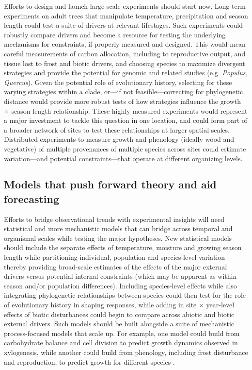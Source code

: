 Efforts to design and launch large-scale experiments should start now. Long-term experiments on adult trees that manipulate temperature, precipitation and season length could test a suite of drivers at relevant lifestages. Such experiments could robustly compare drivers and become a resource for testing the underlying mechanisms for constraints, if properly measured and designed. This would mean careful measurements of carbon allocation, including to reproductive output, and tissue lost to frost and biotic drivers, and choosing species to maximize divergent strategies and provide the potential for genomic and related studies (e.g. \emph{Populus, Quercus}). Given the potential role of evolutionary history, selecting for these varying strategies within a clade, or---if not feasible---correcting for phylogenetic distance would provide more robust tests of how strategies influence the growth $\times$ season length relationship. %
These highly measured experiments  would represent a major investment to tackle this question in one location, and could form part of a broader network of sites to test these relationships at larger spatial scales. Distributed experiments to measure growth and phenology (ideally wood and vegetative) of multiple provenances of multiple species across sites could estimate variation---and potential constraints---that operate at different organizing levels. 

\subsection*{Models that push forward theory and aid forecasting}
Efforts to bridge observational trends with experimental insights will need statistical and more mechanistic models that can bridge across temporal and organismal scales while testing the major hypotheses. New statistical models should include the separate effects of temperature, moisture and growing season length while partitioning individual, population and species-level variation---thereby providing broad-scale estimates of the effects of the major external drivers versus potential internal constraints (which may be apparent as within-season and/or population differences). Including species-level effects while also integrating phylogenetic relationships between species could then test for the role of evolutionary history in shaping responses, while adding in site $\times$ year-level effects of biotic disturbances could begin to compare across abiotic and biotic external drivers. Such models should be built alongside a suite of mechanistic process-focused models that scale up. For example, one model could build from carbohydrate balance and cell division \citep[e.g.][]{locosselli2017dendrobiochemistry} to predict growth dynamics observed in xylogenesis, while another could build from phenology, including frost disturbance and reproduction, to predict growth for different species \citep[e.g.][]{chuineJTB}. 

